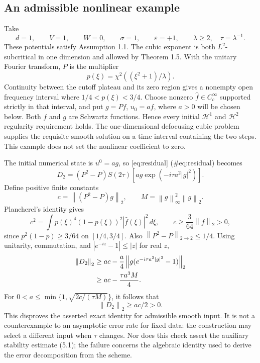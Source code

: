 \documentclass[10pt]{article}
\begin{document}
\subsection*{An admissible nonlinear example}
Take \[d=1,\qquad V=1,\qquad W=0,\qquad \sigma=1,\qquad \varepsilon=+1,
 \qquad \lambda\ge2,\quad \tau=\lambda^{-1}.\] These potentials satisfy Assumption 1.1. The cubic exponent is both \(L^2\)-subcritical in one dimension and allowed by Theorem 1.5. With the unitary Fourier transform, \(P\) is the multiplier \[p(\xi)=\chi^2((\xi^2+1)/\lambda).\] Continuity between the cutoff plateau and its zero region gives a nonempty open frequency interval where \(1/4<p(\xi)<3/4\). Choose nonzero \(\widehat f\in C_c^\infty\) supported strictly in that interval, and put \(g=Pf\), \(u_0=af\), where \(a>0\) will be chosen below. Both \(f\) and \(g\) are Schwartz functions. Hence every initial \(\mathcal H^1\) and \(\mathcal H^2\) regularity requirement holds. The one-dimensional defocusing cubic problem supplies the requisite smooth solution on a time interval containing the two steps. This example does not set the nonlinear coefficient to zero.\par
The initial numerical state is \(u^0=ag\), so [eq:residual] (\#eq:residual) becomes \[D_2=(P^2-P)S(2\tau)
          [ag\exp(-i\tau a^2|g|^2)].\] Define positive finite constants \[c=\left\lVert(P^2-P)g\right\rVert_2,\qquad
 M=\left\lVert g\right\rVert_\infty^2\left\lVert g\right\rVert_2.\] Plancherel’s identity gives \[c^2=\int p(\xi)^4(1-p(\xi))^2|\widehat f(\xi)|^2\,d\xi,
 \qquad c\ge\frac{3}{64}\left\lVert f\right\rVert_2>0,\] since \(p^2(1-p)\ge3/64\) on \([1/4,3/4]\). Also \(\left\lVert P^2-P\right\rVert_{2\to2}\le1/4\). Using unitarity, commutation, and \(|e^{-iz}-1|\le|z|\) for real \(z\), \[\begin{aligned}
 \left\lVert D_2\right\rVert_2
 &\ge ac-\frac a4\left\lVert g(e^{-i\tau a^2|g|^2}-1)\right\rVert_2 \notag\\
 &\ge ac-\frac{\tau a^3M}{4}.\end{aligned}\] For \(0<a\le\min\{1,\sqrt{2c/(\tau M)}\}\), it follows that \[\left\lVert D_2\right\rVert_2\ge ac/2>0.\] This disproves the asserted exact identity for admissible smooth input. It is not a counterexample to an asymptotic error rate for fixed data: the construction may select a different input when \(\tau\) changes. Nor does this check assert the auxiliary stability estimate (5.1); the failure concerns the algebraic identity used to derive the error decomposition from the scheme.\par
\end{document}
